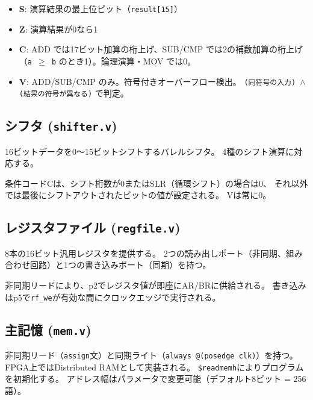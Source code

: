 \documentclass[a4paper,11pt]{ltjsarticle}
\begin{document}
\begin{itemize}
\item \textbf{S}: 演算結果の最上位ビット（\texttt{result[15]}）
\item \textbf{Z}: 演算結果が0なら1
\item \textbf{C}: ADD では17ビット加算の桁上げ、SUB/CMP では2の補数加算の桁上げ
  （\texttt{a $\geq$ b} のとき1）。論理演算・MOV では0。
\item \textbf{V}: ADD/SUB/CMP のみ。符号付きオーバーフロー検出。
  \texttt{(同符号の入力) $\wedge$ (結果の符号が異なる)} で判定。
\end{itemize}

\subsection{シフタ (\texttt{shifter.v})}

16ビットデータを0〜15ビットシフトするバレルシフタ。
4種のシフト演算に対応する。



条件コードCは、シフト桁数が0またはSLR（循環シフト）の場合は0、
それ以外では最後にシフトアウトされたビットの値が設定される。
Vは常に0。

\subsection{レジスタファイル (\texttt{regfile.v})}

8本の16ビット汎用レジスタを提供する。
2つの読み出しポート（非同期、組み合わせ回路）と1つの書き込みポート（同期）を持つ。



非同期リードにより、p2でレジスタ値が即座にAR/BRに供給される。
書き込みはp5で\texttt{rf\_we}が有効な間にクロックエッジで実行される。

\subsection{主記憶 (\texttt{mem.v})}



非同期リード（\texttt{assign}文）と同期ライト（\texttt{always @(posedge clk)}）を持つ。
FPGA上ではDistributed RAMとして実装される。
\texttt{\$readmemh}によりプログラムを初期化する。
アドレス幅はパラメータで変更可能（デフォルト8ビット = 256語）。
\end{document}
